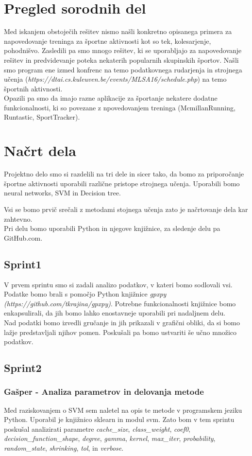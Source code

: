\documentclass[a4paper,11pt]{article}
\begin{document}
\section{Pregled sorodnih del}
Med iskanjem obstoječih rešitev nismo našli konkretno opisanega primera 
za napovedovanje treninga za športne aktivnosti kot so tek, kolesarjenje,
pohodnišvo. Zasledili pa smo mnogo rešitev, ki se uporabljajo za napovedovanje
rešitev in predvidevanje poteka nekaterih popularnih skupinskih športov.
Našli smo program ene izmed konfrenc na temo podatkovnega rudarjenja in 
strojnega učenja (\textit{https://dtai.cs.kuleuven.be/events/MLSA16/schedule.php}) na 
temo športnih aktivnosti.\\
Opazili pa smo da imajo razne aplikacije za športanje nekatere dodatne funkcionalnosti,
ki so povezane z npovedovanjem treninga (McmillanRunning, Runtastic, SportTracker).
\section{Načrt dela}

Projektno delo smo si razdelili na tri dele in sicer tako, da bomo za priporočanje športne aktivnosti uporabili različne pristope strojnega učenja. 
Uporabili bomo neural networks, SVM in Decision tree. 

Vsi se bomo prvič srečali z metodami stojnega učenja zato je načrtovanje dela kar zahtevno. \\
Pri delu bomo uporabili Python in njegove knjižnice, za sledenje delu pa GitHub.com. 

\subsection{Sprint1}
V prvem sprintu smo si zadali analizo podatkov, v kateri bomo sodlovali vsi. Podatke bomo brali s pomočjo Python knjižnice \textit{gpxpy (https://github.com/tkrajina/gpxpy)}. Potrebne funkcionalnosti knjižnice bomo enkapsulirali, da jih bomo lahko enostavneje uporabili pri nadaljnem delu.\\ Nad podatki bomo izvedli gručanje in jih prikazali v grafični obliki, da si bomo lažje predstavljali njihov pomen. Poskušali pa bomo ustvariti še učno množico podatkov.


\subsection{Sprint2}
\subsubsection{Gašper - Analiza parametrov in delovanja metode}
Med raziskovanjem o SVM sem naletel na opis te metode v programskem jeziku Python. Uporabil je knjižnico sklearn in modul svm. Zato bom v tem sprintu poskušal analizirati parametre \textit{cache_size}, \textit{class_weight}, \textit{coef0}, \textit{decision_function_shape}, \textit{degree}, \textit{gamma}, \textit{kernel}, \textit{max_iter}, \textit{probability}, \textit{random_state}, \textit{shrinking}, \textit{tol}, in \textit{verbose}. \\
\end{document}
